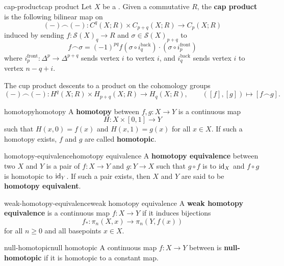 \begin{topic}{cap-product}{cap product}
    Let $X$ be a . Given a commutative  $R$, the \textbf{cap product} is the following bilinear map on 
    \[ (-) \frown (-) : C^q(X; R) \times C_{p + q}(X; R) \to C_p(X; R) \]
    induced by sending $f : \mathcal{S}(X)_q \to R$ and $\sigma \in \mathcal{S}(X)_{p + q}$ to
    \[ f \frown \sigma = (-1)^{pq} f(\sigma \circ i_q^\text{back}) \cdot (\sigma \circ i_p^\text{front})  \]
    where $i_p^\text{front} : \Delta^{p} \to \Delta^{p + q}$ sends vertex $i$ to vertex $i$, and $i_q^\text{back}$ sends vertex $i$ to vertex $n - q + i$.
    
    The cup product descents to a product on the cohomology groups
    \[ (-) \frown (-) : H^q(X; R) \times H_{p + q}(X; R) \to H_q(X; R), \qquad ([f], [g]) \mapsto [f \frown g] . \]
\end{topic}

\begin{topic}{homotopy}{homotopy}
    A \textbf{homotopy} between  $f, g : X \to Y$ is a continuous map
    \[ H : X \times [0, 1] \to Y \]
    such that $H(x, 0) = f(x)$ and $H(x, 1) = g(x)$ for all $x \in X$. If such a homotopy exists, $f$ and $g$ are called \textbf{homotopic}.
\end{topic}

\begin{topic}{homotopy-equivalence}{homotopy equivalence}
    A \textbf{homotopy equivalence} between two  $X$ and $Y$ is a pair of  $f : X \to Y$ and $g : Y \to X$ such that $g \circ f$ is  to $\text{id}_X$ and $f \circ g$ is homotopic to $\text{id}_Y$. If such a pair exists, then $X$ and $Y$ are said to be \textbf{homotopy equivalent}.
\end{topic}

\begin{topic}{weak-homotopy-equivalence}{weak homotopy equivalence}
    A \textbf{weak homotopy equivalence} is a continuous map $f : X \to Y$ if it induces bijections
    \[ f_* : \pi_n(X, x) \to \pi_n(Y, f(x)) \]
    for all $n \ge 0$ and all basepoints $x \in X$.
\end{topic}

\begin{topic}{null-homotopic}{null homotopic}
    A continuous map $f : X \to Y$ between  is \textbf{null-homotopic} if it is homotopic to a constant map.
\end{topic}


